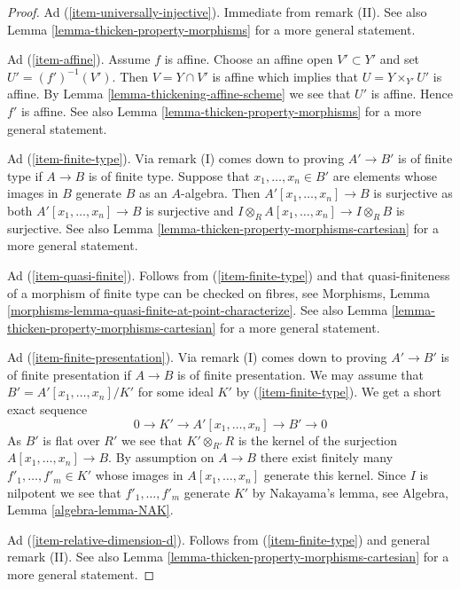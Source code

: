 \documentclass[10pt,a4paper]{amsart}
\theoremstyle{plain}
\theoremstyle{definition}
\theoremstyle{remark}
\numberwithin{equation}{subsection}
\begin{document}
\begin{proof}
\medskip\noindent
Ad (\ref{item-universally-injective}). Immediate from remark (II). See also
Lemma \ref{lemma-thicken-property-morphisms} for a more general statement.

\medskip\noindent
Ad (\ref{item-affine}). Assume $f$ is affine.  Choose an
affine open $V' \subset Y'$ and set $U' = (f')^{-1}(V')$.
Then $V = Y \cap V'$ is affine which implies that
$U = Y \times_{Y'} U'$ is affine. By
Lemma \ref{lemma-thickening-affine-scheme}
we see that $U'$ is affine. Hence $f'$ is affine. See also
Lemma \ref{lemma-thicken-property-morphisms} for a more general statement.

\medskip\noindent
Ad (\ref{item-finite-type}). Via remark (I) comes down to proving $A' \to B'$
is of finite type if $A \to B$ is of finite type. Suppose that
$x_1, \ldots, x_n \in B'$ are elements whose images in $B$ generate $B$
as an $A$-algebra. Then $A'[x_1, \ldots, x_n] \to B$ is surjective
as both $A'[x_1, \ldots, x_n] \to B$ is surjective and
$I \otimes_R A[x_1, \ldots, x_n] \to I \otimes_R B$ is surjective. See also
Lemma \ref{lemma-thicken-property-morphisms-cartesian}
for a more general statement.

\medskip\noindent
Ad (\ref{item-quasi-finite}). Follows from (\ref{item-finite-type}) and that
quasi-finiteness of a morphism of finite type can be checked on fibres, see
Morphisms, Lemma \ref{morphisms-lemma-quasi-finite-at-point-characterize}.
See also Lemma \ref{lemma-thicken-property-morphisms-cartesian}
for a more general statement.

\medskip\noindent
Ad (\ref{item-finite-presentation}). Via remark (I) comes down to proving
$A' \to B'$ is of finite presentation if $A \to B$ is of finite presentation.
We may assume that $B' = A'[x_1, \ldots, x_n]/K'$ for some ideal $K'$ by
(\ref{item-finite-type}). We get a short exact sequence
$$
0 \to K' \to A'[x_1, \ldots, x_n] \to B' \to 0
$$
As $B'$ is flat over $R'$ we see that $K' \otimes_{R'} R$ is the kernel of
the surjection $A[x_1, \ldots, x_n] \to B$. By assumption on $A \to B$ there
exist finitely many $f'_1, \ldots, f'_m \in K'$ whose images in
$A[x_1, \ldots, x_n]$ generate this kernel. Since $I$ is nilpotent we see
that $f'_1, \ldots, f'_m$ generate $K'$ by Nakayama's lemma, see
Algebra, Lemma \ref{algebra-lemma-NAK}.

\medskip\noindent
Ad (\ref{item-relative-dimension-d}). Follows from (\ref{item-finite-type})
and general remark (II). See also
Lemma \ref{lemma-thicken-property-morphisms-cartesian}
for a more general statement.


\end{proof}
\end{document}
